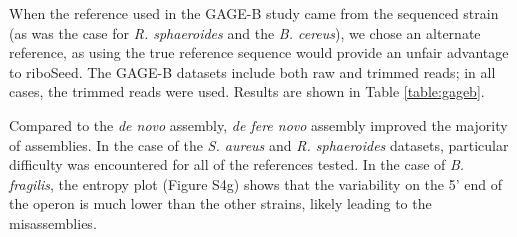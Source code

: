 \documentclass[a4,center,fleqn]{NAR}
\begin{document}
When the reference used in the GAGE-B study came from the sequenced strain (as was the case for \textit{R. sphaeroides}  and  the \textit{B. cereus}), we chose an alternate reference, as using the true reference sequence would provide an unfair advantage to riboSeed. The GAGE-B datasets include both raw and trimmed reads; in all cases, the trimmed reads were used. Results are shown in Table \ref{table:gageb}.

Compared to the \textit{de novo} assembly, \textit{de fere novo} assembly improved the majority of assemblies. In the case of the \textit{S. aureus} and \textit{R. sphaeroides} datasets, particular difficulty was encountered for all of the references tested. In the case of \textit{B. fragilis}, the entropy plot (Figure S4g) shows that the variability on the 5' end of the operon is much lower than the other strains, likely leading to the misassemblies.
\end{document}
